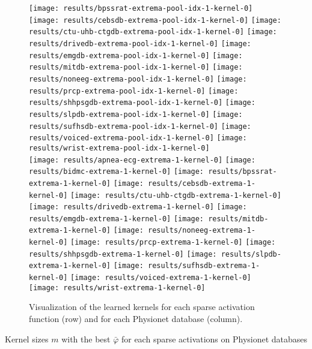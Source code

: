 \documentclass[journal]{IEEEtran}
\begin{document}
\begin{figure*}[!t]
	\texttt{[image: results/bpssrat-extrema-pool-idx-1-kernel-0]}
	\texttt{[image: results/cebsdb-extrema-pool-idx-1-kernel-0]}
	\texttt{[image: results/ctu-uhb-ctgdb-extrema-pool-idx-1-kernel-0]}
	\texttt{[image: results/drivedb-extrema-pool-idx-1-kernel-0]}
	\texttt{[image: results/emgdb-extrema-pool-idx-1-kernel-0]}
	\texttt{[image: results/mitdb-extrema-pool-idx-1-kernel-0]}
	\texttt{[image: results/noneeg-extrema-pool-idx-1-kernel-0]}
	\texttt{[image: results/prcp-extrema-pool-idx-1-kernel-0]}
	\texttt{[image: results/shhpsgdb-extrema-pool-idx-1-kernel-0]}
	\texttt{[image: results/slpdb-extrema-pool-idx-1-kernel-0]}
	\texttt{[image: results/sufhsdb-extrema-pool-idx-1-kernel-0]}
	\texttt{[image: results/voiced-extrema-pool-idx-1-kernel-0]}
	\texttt{[image: results/wrist-extrema-pool-idx-1-kernel-0]}
	\\
	\texttt{[image: results/apnea-ecg-extrema-1-kernel-0]}
	\texttt{[image: results/bidmc-extrema-1-kernel-0]}
	\texttt{[image: results/bpssrat-extrema-1-kernel-0]}
	\texttt{[image: results/cebsdb-extrema-1-kernel-0]}
	\texttt{[image: results/ctu-uhb-ctgdb-extrema-1-kernel-0]}
	\texttt{[image: results/drivedb-extrema-1-kernel-0]}
	\texttt{[image: results/emgdb-extrema-1-kernel-0]}
	\texttt{[image: results/mitdb-extrema-1-kernel-0]}
	\texttt{[image: results/noneeg-extrema-1-kernel-0]}
	\texttt{[image: results/prcp-extrema-1-kernel-0]}
	\texttt{[image: results/shhpsgdb-extrema-1-kernel-0]}
	\texttt{[image: results/slpdb-extrema-1-kernel-0]}
	\texttt{[image: results/sufhsdb-extrema-1-kernel-0]}
	\texttt{[image: results/voiced-extrema-1-kernel-0]}
	\texttt{[image: results/wrist-extrema-1-kernel-0]}
	\caption{Visualization of the learned kernels for each sparse activation function (row) and for each Physionet database (column).
	}
	\label{fig:kernelvisualization}
\end{figure*}

\begin{table*}[!t]
	\centering
	\caption{Kernel sizes $m$ with the best $\bar\varphi$ for each sparse activations on Physionet databases}
	\label{table:crrl}
	\setlength\tabcolsep{4pt}
	
\end{table*}
\end{document}
